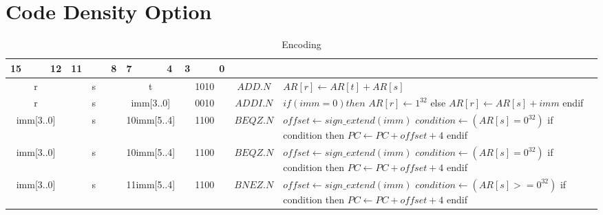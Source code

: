 \section{Code Density Option}

\begin{longtable}{llllllllllllllll  p{1cm}  p{7cm} | }
		\caption{Encoding\label{long}}\\
		15 & & & 12 & 11 & & & 8 & 7 & & & 4 & 3 & & & 0 & & \multicolumn{1}{c}{}\\
		\hline
        \endhead
		\multicolumn{4}{|c|}{r} & \multicolumn{4}{c|}{s} & \multicolumn{4}{c|}{t} & \multicolumn{4}{c|}{1010} & \multicolumn{1}{c|}{$ADD.N$} & $AR[r] \leftarrow AR[t] + AR[s]$ \\ \hline
		\multicolumn{4}{|c|}{r} & \multicolumn{4}{c|}{s} & \multicolumn{4}{c|}{imm[3..0]} & \multicolumn{4}{c|}{0010} & \multicolumn{1}{c|}{$ADDI.N$} & $if (imm = 0) then$ \newline $AR[r] \leftarrow 1^{32}$ \newline else \newline $AR[r] \leftarrow AR[s] + imm$ \newline endif \\ \hline
		\multicolumn{4}{|c|}{imm[3..0]} & \multicolumn{4}{c|}{s} & \multicolumn{4}{c|}{10imm[5..4]} & \multicolumn{4}{c|}{1100} & \multicolumn{1}{c|}{$BEQZ.N$} & $offset \leftarrow sign\_extend(imm)$ \newline $condition \leftarrow (AR[s] = 0^{32})$ \newline if condition then \newline $PC \leftarrow PC + offset + 4$ \newline endif \\ \hline
		\multicolumn{4}{|c|}{imm[3..0]} & \multicolumn{4}{c|}{s} & \multicolumn{4}{c|}{10imm[5..4]} & \multicolumn{4}{c|}{1100} & \multicolumn{1}{c|}{$BEQZ.N$} & $offset \leftarrow sign\_extend(imm)$ \newline $condition \leftarrow (AR[s] = 0^{32})$ \newline if condition then \newline $PC \leftarrow PC + offset + 4$ \newline endif \\ \hline
		\multicolumn{4}{|c|}{imm[3..0]} & \multicolumn{4}{c|}{s} & \multicolumn{4}{c|}{11imm[5..4]} & \multicolumn{4}{c|}{1100} & \multicolumn{1}{c|}{$BNEZ.N$} & $offset \leftarrow sign\_extend(imm)$ \newline $condition \leftarrow (AR[s] >= 0^{32})$ \newline if condition then \newline $PC \leftarrow PC + offset + 4$ \newline endif \\ \hline

\end{longtable}
